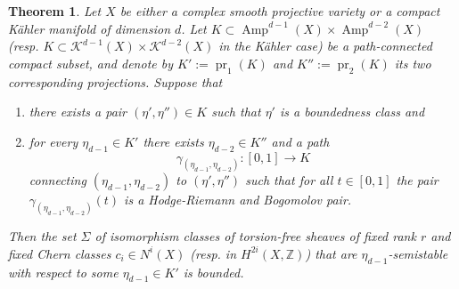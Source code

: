 \documentclass[10pt,a4paper]{amsart}
\newtheorem{theorem}{Theorem}
\DeclareMathOperator{\Amp}{Amp}
\newcommand{\Z}{\mathbb{Z}}
\def\cK{\mathcal K}
\DeclareMathOperator{\pr}{pr}
\begin{document}
\begin{theorem}\label{thm:MainBound}
Let $X$ be either a complex smooth projective variety or a compact K\"ahler manifold of dimension $d$. Let $K \subset \Amp^{d-1}(X) \times \Amp^{d-2}(X)$ (resp. $K \subset \cK^{d-1}(X) \times \cK^{d-2}(X)$ in the K\"ahler case) be a path-connected compact subset, and denote by $K' := \pr_1(K)$ and $K'' := \pr_2(K)$ its two corresponding projections. Suppose that

\begin{enumerate}
    \item there exists a pair $(\eta',\eta'') \in K$ such that $\eta'$ is a boundedness class and
    \item for every $\eta_{d-1} \in K'$ there exists $\eta_{d-2} \in K''$ and a path $$\gamma_{(\eta_{d-1},\eta_{d-2})} : [0,1] \to K$$ connecting $(\eta_{d-1},\eta_{d-2})$ to $(\eta',\eta'')$ such that for all $t \in [0,1]$ the pair $\gamma_{(\eta_{d-1},\eta_{d-2})}(t)$ is a Hodge-Riemann and Bogomolov pair. 
\end{enumerate}
Then the set $\Sigma$ of isomorphism classes of torsion-free sheaves of fixed rank $r$ and fixed Chern classes $c_i \in N^i(X)$ (resp. in $H^{2i}(X,\Z)$) that are $\eta_{d-1}$-semistable with respect to some $\eta_{d-1}\in K'$ is bounded.
\end{theorem}
\end{document}
